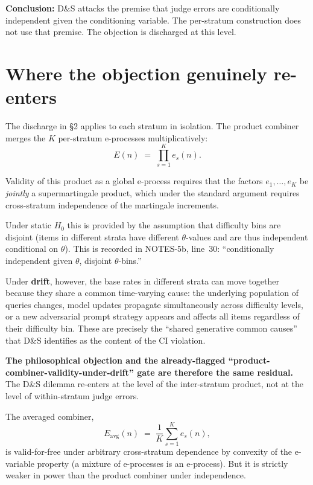 \documentclass[11pt,a4paper]{article}
\begin{document}
\textbf{Conclusion:}  D\&S attacks the premise that judge errors are
conditionally independent given the conditioning variable.  The
per-stratum construction does not use that premise.  The objection is
discharged at this level.

\section{Where the objection genuinely re-enters}

The discharge in \S2 applies to each stratum in isolation.  The
product combiner merges the $K$ per-stratum e-processes multiplicatively:
\[
  E(n) \;=\; \prod_{s=1}^{K} e_s(n).
\]

Validity of this product as a global e-process requires that the
factors $e_1, \ldots, e_K$ be \emph{jointly} a supermartingale product,
which under the standard argument requires cross-stratum independence
of the martingale increments.

Under static $H_0$ this is provided by the assumption that difficulty
bins are disjoint (items in different strata have different $\theta$-values
and are thus independent conditional on $\theta$).  This is recorded
in NOTES-5b, line~30: ``conditionally independent given $\theta$,
disjoint $\theta$-bins.''

Under \textbf{drift}, however, the base rates in different strata can
move together because they share a common time-varying cause: the
underlying population of queries changes, model updates propagate
simultaneously across difficulty levels, or a new adversarial prompt
strategy appears and affects all items regardless of their difficulty
bin.  These are precisely the ``shared generative common causes'' that
D\&S identifies as the content of the CI violation.

\textbf{The philosophical objection and the already-flagged
``product-combiner-validity-under-drift'' gate are therefore the same
residual.}  The D\&S dilemma re-enters at the level of the
inter-stratum product, not at the level of within-stratum judge errors.

The averaged combiner,
\[
  E_{\text{avg}}(n) \;=\; \frac{1}{K}\sum_{s=1}^{K} e_s(n),
\]
is valid-for-free under arbitrary cross-stratum dependence by convexity
of the e-variable property (a mixture of e-processes is an e-process).
But it is strictly weaker in power than the product combiner under
independence.
\end{document}
